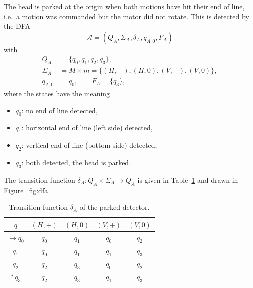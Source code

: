 The head is parked at the origin when both motions have hit their end of line, i.e.\ a motion was commanded but the motor did not rotate. This is detected by the DFA
\begin{equation}
\label{eq:dfa_tuple}
\mathcal{A} = (Q_A, \Sigma_A, \delta_A, q_{A,0}, F_A)
\end{equation}
with
\begin{equation}
\label{eq:dfa_sets}
\begin{aligned}
Q_A &= \{q_0, q_1, q_2, q_3\}, \\
\Sigma_A &= M \times m = \{(H,+), (H,0), (V,+), (V,0)\}, \\
q_{A,0} &= q_0, \qquad F_A = \{q_3\},
\end{aligned}
\end{equation}
where the states have the meaning
\begin{itemize}[noitemsep]
  \item $q_0$: no end of line detected,
  \item $q_1$: horizontal end of line (left side) detected,
  \item $q_2$: vertical end of line (bottom side) detected,
  \item $q_3$: both detected, the head is parked.
\end{itemize}
The transition function $\delta_A : Q_A \times \Sigma_A \to Q_A$ is given in Table~\ref{tab:dfa_delta} and drawn in Figure~\ref{fig:dfa_}. 


\begin{table}[H]
\centering
\caption{Transition function $\delta_A$ of the parked detector.}
\label{tab:dfa_delta}
\begin{tabular}{ccccc}
\toprule
$q$ & $(H,+)$ & $(H,0)$ & $(V,+)$ & $(V,0)$ \\
\midrule
$\rightarrow q_0$ & $q_0$ & $q_1$ & $q_0$ & $q_2$ \\
$q_1$             & $q_0$ & $q_1$ & $q_1$ & $q_3$ \\
$q_2$             & $q_2$ & $q_3$ & $q_0$ & $q_2$ \\
$*\,q_3$          & $q_2$ & $q_3$ & $q_1$ & $q_3$ \\
\bottomrule
\end{tabular}
\end{table}

